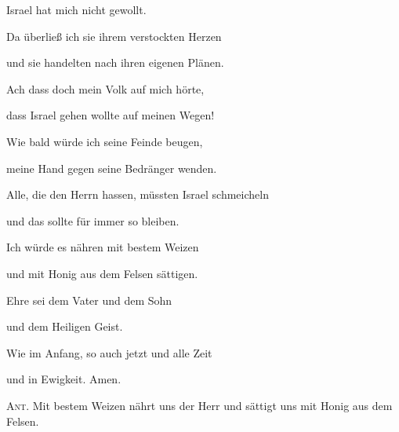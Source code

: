 Israel hat mich nicht gewollt.

\noindent Da überließ ich sie ihrem verstockten Herzen~\GreStar{}~\nopagebreak

und sie handelten nach ihren eigenen Plänen. 

\noindent Ach dass doch mein Volk auf mich hörte,~\GreStar{}~\nopagebreak

dass Israel gehen wollte auf meinen Wegen!

\noindent Wie bald würde ich seine Feinde beugen,~\GreStar{}~\nopagebreak

meine Hand gegen seine Bedränger wenden. 

\noindent Alle, die den Herrn hassen, müssten Israel schmeicheln~\GreStar{}~\nopagebreak

und das sollte für immer so bleiben. 

\noindent Ich würde es nähren mit bestem Weizen~\GreStar{}~\nopagebreak

und mit Honig aus dem Felsen sättigen.

\noindent Ehre sei dem Vater und dem Sohn~\GreStar{}~\nopagebreak

und dem Heiligen Geist.

\noindent Wie im Anfang, so auch jetzt und alle Zeit~\GreStar{}~\nopagebreak

und in Ewigkeit. Amen.

\vspace{10pt}

\noindent \textsc{Ant.} Mit bestem Weizen nährt uns der Herr und sättigt uns mit Honig aus dem Felsen.
